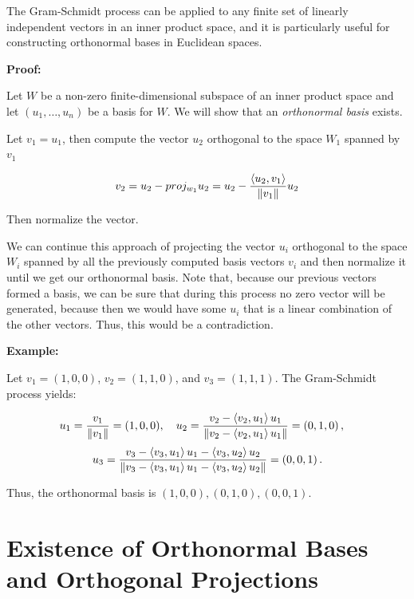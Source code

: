 The Gram-Schmidt process can be applied to any finite set of linearly independent vectors in an inner 
product space, and it is particularly useful for constructing orthonormal bases in Euclidean spaces.

\textbf{Proof:}

Let \(W\) be a non-zero finite-dimensional subspace of an inner product space and let 
\((u_1, \dots, u_n)\) be a basis for \(W\). We will show that an \emph{orthonormal basis} exists.

Let \(v_1 = u_1\), then compute the vector \(u_2\) orthogonal to the space \(W_1\) spanned by \(v_1\)

\[
    v_2 = u_2 - proj_{w_1} u_2 = u_2 - \frac{\left\langle u_2, v_1\right\rangle}{\left\| v_1 \right\|} u_2
\]

Then normalize the vector.

We can continue this approach of projecting the vector \(u_i\) orthogonal to the space \(W_i\) 
spanned by all the previously computed basis vectors \(v_i\) and then normalize it 
until we get our orthonormal basis. Note that, because our previous vectors formed a basis, we can be 
sure that during this process no zero vector will be generated, because then we would have 
some \(u_i\) that is a linear combination of the other vectors. Thus, this would be a contradiction.

\QED

\textbf{Example:}

Let \( v_1 = (1, 0, 0) \), \( v_2 = (1, 1, 0) \), and \( v_3 = (1, 1, 1) \). The Gram-Schmidt process 
yields:

\[
    u_1 = \frac{v_1}{\left\| v_1 \right\|} = (1, 0, 0), \quad
    u_2 = \frac{v_2 - \left\langle v_2, u_1\right\rangle u_1}{\|v_2 - \left\langle v_2, u_1\right\rangle u_1\|} = 
    \left(0, 1, 0\right), \quad
\]
\[
    u_3 = \frac{v_3 - \left\langle v_3, u_1\right\rangle u_1 - \left\langle v_3, u_2\right\rangle u_2}{\|v_3 - \left\langle v_3, u_1\right\rangle u_1 - \left\langle v_3, u_2\right\rangle u_2\|} = \left(0, 0, 1\right).
\]

Thus, the orthonormal basis is \( (1, 0, 0), (0, 1, 0), (0, 0, 1) \).

\section{Existence of Orthonormal Bases and Orthogonal Projections}


